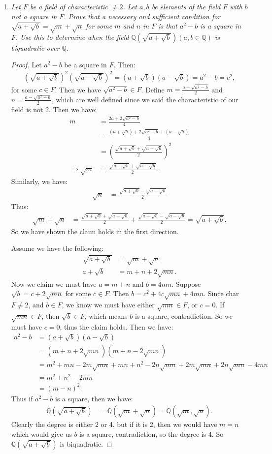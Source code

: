\documentclass[10pt,oneside,reqno]{amsart}
\theoremstyle{plain}
\theoremstyle{definition}
\theoremstyle{remark}
\theoremstyle{plain}
\newcommand{\Q}{\mathbb{Q}}
\newcommand{\bee}{\begin{equation}\begin{aligned}}
\newcommand{\eee}{\end{aligned}\end{equation}}
\newcommand{\fracc}{\frac}
\newcommand{\lpar}{\left(}
\newcommand{\rpar}{\right)}
\begin{document}
\begin{enumerate}[label=\arabic*.]
\item \textit{Let $F$ be a field of characteristic $\neq 2$. Let $a,b$ be elements of the field $F$ with $b$ not a square in $F$. Prove that a necessary and sufficient condition for $\sqrt{a + \sqrt{b}} = \sqrt{m} + \sqrt{n}$ for some $m$ and $n$ in $F$ is that $a^2 - b$ is a square in $F$. Use this to determine when the field $\Q(\sqrt{a + \sqrt{b}})(a,b \in \Q)$ is biquadratic over $\Q$. }

\begin{proof}
Let $a^2 - b$ be a square in $F$. Then:
\bee
\lpar \sqrt{a + \sqrt{b}} \rpar^2 \lpar \sqrt{a - \sqrt{b}} \rpar^2 = (a + \sqrt{b})(a - \sqrt{b}) = a^2 - b = c^2,
\eee
for some $c \in F$. Then we have $\sqrt{a^2 - b} \in F$. Define $m = \fracc{a + \sqrt{a^2 - b}}{2}$ and $n = \fracc{a - \sqrt{a^2 - b}}{2}$, which are well defined since we said the characteristic of our field is not 2. Then we have:
\bee
m &= \fracc{2a + 2\sqrt{a^2 - b}}{4}\\
&= \fracc{(a + \sqrt{b}) + 2\sqrt{a^2 - b} + (a - \sqrt{b})}{4}\\
&= \lpar \fracc{\sqrt{a + \sqrt{b}} + \sqrt{a - \sqrt{b}}}{2} \rpar^2\\
\Rightarrow \sqrt{m} &= \fracc{\sqrt{a + \sqrt{b}} + \sqrt{a - \sqrt{b}}}{2}.
\eee
Similarly, we have:
\bee
\sqrt{n} &=  \fracc{\sqrt{a + \sqrt{b}} - \sqrt{a - \sqrt{b}}}{2}
\eee
Thus:
\bee
\sqrt{m} + \sqrt{n} &= \fracc{\sqrt{a + \sqrt{b}} + \sqrt{a - \sqrt{b}}}{2} + \fracc{\sqrt{a + \sqrt{b}} - \sqrt{a - \sqrt{b}}}{2} = \sqrt{a + \sqrt{b}}.
\eee
So we have shown the claim holds in the first direction.



Assume we have the following:
\bee
\sqrt{a + \sqrt{b}} &= \sqrt{m} + \sqrt{n}\\
a + \sqrt{b} &= m + n + 2\sqrt{mn}.
\eee
Now we claim we must have $a = m + n$ and $b = 4mn$. Suppose $\sqrt{b} = c + 2\sqrt{mn}$ for some $c \in F$. Then $b = c^2 + 4c\sqrt{mn} + 4mn$. Since char$F \neq 2$, and $b \in F$, we know we must have either $\sqrt{mn} \in F$, or $c = 0$. If $\sqrt{mn} \in F$, then $\sqrt{b} \in F$, which means $b$ is a square, contradiction. So we must have $c = 0$, thus the claim holds. Then we have:
\bee
a^2 - b &= (a + \sqrt{b})(a - \sqrt{b})\\
&= (m + n + 2\sqrt{mn})(m + n - 2\sqrt{mn})\\
&= m^2 + mn - 2m\sqrt{mn} + mn + n^2 - 2n\sqrt{mn} + 2m\sqrt{mn} + 2n\sqrt{mn} - 4mn\\
&= m^2 + n^2 - 2mn\\
&= (m - n)^2.
\eee
Thus if $a^2 - b$ is a square, then we have:
\bee
\Q(\sqrt{a + \sqrt{b}}) &= \Q(\sqrt{m} + \sqrt{n}) = \Q(\sqrt{m},\sqrt{n}).
\eee
Clearly the degree is either 2 or 4, but if it is 2, then we would have $m = n$ which would give us $b$ is a square, contradiction, so the degree is 4. So $\Q(\sqrt{a + \sqrt{b}})$ is biquadratic. 
\end{proof}


\end{enumerate}
\end{document}
